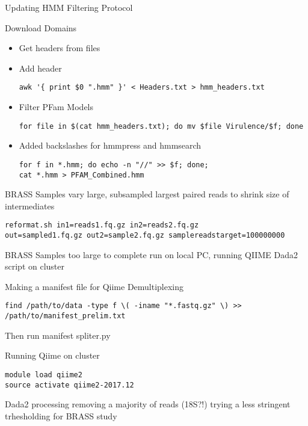 \documentclass[idxtotoc,hyperref,openany,oneside]{labbook} %
\begin{document}

Updating HMM Filtering Protocol

Download Domains

\begin{itemize}
\item Get headers from files
\item Add header 
\begin{verbatim}
awk '{ print $0 ".hmm" }' < Headers.txt > hmm_headers.txt
\end{verbatim}
\item Filter PFam Models
\begin{verbatim}
for file in $(cat hmm_headers.txt); do mv $file Virulence/$f; done
\end{verbatim}

\item Added backslashes for hmmpress and hmmsearch
\begin{verbatim}
for f in *.hmm; do echo -n "//" >> $f; done; 
cat *.hmm > PFAM_Combined.hmm

\end{verbatim}

\end{itemize}





BRASS Samples vary large, subsampled largest paired reads to shrink size of intermediates

\begin{verbatim}
reformat.sh in1=reads1.fq.gz in2=reads2.fq.gz 
out=sampled1.fq.gz out2=sample2.fq.gz samplereadstarget=100000000

\end{verbatim}

BRASS Samples too large to complete run on local PC, running QIIME Dada2 script on cluster

Making a manifest file for Qiime Demultiplexing
\begin{verbatim}
find /path/to/data -type f \( -iname "*.fastq.gz" \) >> 
/path/to/manifest_prelim.txt
\end{verbatim}
Then run manifest spliter.py

Running Qiime on cluster
\begin{verbatim}
module load qiime2
source activate qiime2-2017.12
\end{verbatim}


Dada2 processing removing a majority of reads (18S?!) trying a less stringent trhesholding for BRASS study
\end{document}
